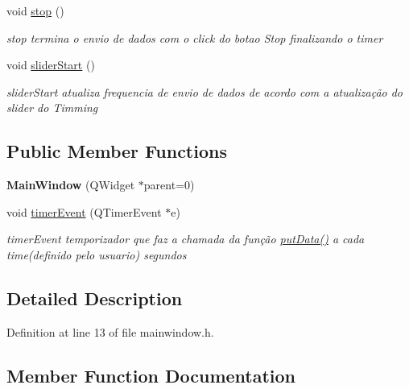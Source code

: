 \begin{DoxyCompactItemize}
\mbox{\label{class_main_window_a939e90ddfe07d74be87b351ca2171fb0}} 
void \hyperlink{class_main_window_a939e90ddfe07d74be87b351ca2171fb0}{stop} ()
\begin{DoxyCompactList}\small\item\em stop termina o envio de dados com o click do botao Stop finalizando o timer \end{DoxyCompactList}\item 
\mbox{\label{class_main_window_a8833996e545dd142223a4b7372bfba6e}} 
void \hyperlink{class_main_window_a8833996e545dd142223a4b7372bfba6e}{slider\+Start} ()
\begin{DoxyCompactList}\small\item\em slider\+Start atualiza frequencia de envio de dados de acordo com a atualização do slider do Timming \end{DoxyCompactList}\end{DoxyCompactItemize}
\subsection*{Public Member Functions}
\begin{DoxyCompactItemize}
\item 
\mbox{\label{class_main_window_a8b244be8b7b7db1b08de2a2acb9409db}} 
{\bfseries Main\+Window} (Q\+Widget $\ast$parent=0)
\item 
void \hyperlink{class_main_window_a9d08a694a5f9c532225754381b8011ea}{timer\+Event} (Q\+Timer\+Event $\ast$e)
\begin{DoxyCompactList}\small\item\em timer\+Event temporizador que faz a chamada da função \hyperlink{class_main_window_afdfeb13ec363b0eb8ecacaf0aa13b605}{put\+Data()} a cada time(definido pelo usuario) segundos \end{DoxyCompactList}\end{DoxyCompactItemize}


\subsection{Detailed Description}


Definition at line 13 of file mainwindow.\+h.



\subsection{Member Function Documentation}
\mbox{\label{class_main_window_a9d08a694a5f9c532225754381b8011ea}} 
